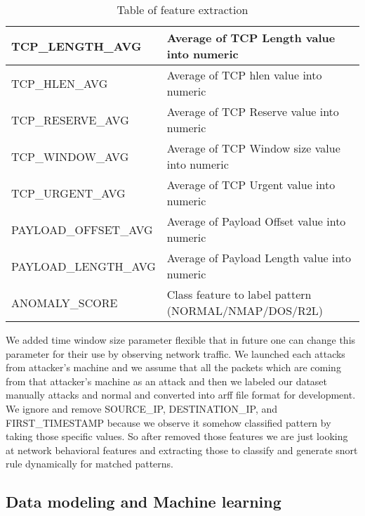 \begin{table}
\begin{center}
\begin{tabular}{|p{3.1cm}|p{4.9cm}|}
\hline
TCP\_LENGTH\_AVG & Average of TCP Length value into numeric\\
\hline
TCP\_HLEN\_AVG & Average of TCP hlen value into numeric\\
\hline
TCP\_RESERVE\_AVG & Average of TCP Reserve value into numeric\\
\hline
TCP\_WINDOW\_AVG & Average of TCP Window size value into numeric\\
\hline
TCP\_URGENT\_AVG & Average of TCP Urgent value into numeric\\
\hline
PAYLOAD\_OFFSET\_AVG & Average of Payload Offset value into numeric\\
\hline
PAYLOAD\_LENGTH\_AVG & Average of Payload Length value into numeric\\
\hline
ANOMALY\_SCORE & Class feature to label pattern (NORMAL/NMAP/DOS/R2L)\\
\hline
\end{tabular}
\end{center}
\caption{Table of feature extraction}
\label{table:features}
\end{table}

\noindent We added time window size parameter flexible that in future one can change this parameter for their use by observing network traffic. We launched each attacks from attacker's machine and we assume that all the packets which are coming from that attacker's machine as an attack and then we labeled our dataset manually attacks and normal and converted into arff file format for development. We ignore and remove SOURCE\_IP, DESTINATION\_IP, and FIRST\_TIMESTAMP because we observe it somehow classified pattern by taking those specific values. So after removed those features we are just looking at network behavioral features and extracting those to classify and generate snort rule dynamically for matched patterns.



\subsection{Data modeling and Machine learning}

